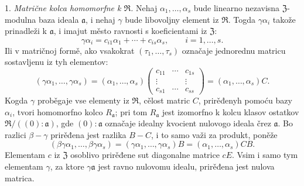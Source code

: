 \documentclass[11pt]{article}
\begin{document}
\setcounter{footnote}{24}

1. \emph{Matrične kolca homomorfne k $\mathfrak R$.} Nehaj $\alpha_1,\ldots,\alpha_s$ bude linearno nezavisna $\mathfrak Z$-modulna baza ideala $\mathfrak a$, i nehaj $\gamma$ bude libovoljny element iz $\mathfrak R$. Togda $\gamma\alpha_i$ takože prinadleži k $\mathfrak a$, i imajut město ravnosti s koeficientami iz $\mathfrak Z$:
\[
        \gamma\alpha_i=c_{i1}\alpha_1+\cdots+c_{is}\alpha_s,
        \qquad i=1,\ldots,s.
\]
Ili v matričnoj formě, ako vsakokrat $(\tau_1,\ldots,\tau_s)$ označaje jednorednu matricu sostavljenu iz tyh elementov:
\[
 (\gamma\alpha_1,\ldots,\gamma\alpha_s)
 = (\alpha_1,\ldots,\alpha_s)
   \begin{pmatrix}
      c_{11}&\cdots&c_{1s}\\
      \vdots&&\vdots\\
      c_{s1}&\cdots&c_{ss}
   \end{pmatrix}
 = (\alpha_1,\ldots,\alpha_s)C.
\]
Kogda $\gamma$ proběgaje vse elementy iz $\mathfrak R$, cělost matric $C$, prirěđenyh pomoću bazy $\alpha_i$, tvori homomorfno kolco $R_\mathfrak a$; pri tom $R_\mathfrak a$ jest izomorfno k kolcu klasov ostatkov $\mathfrak R/((0):\mathfrak a)$, gde $(0):\mathfrak a$ označaje idealny kvocient nulovogo ideala črez $\mathfrak a$. Bo razlici $\beta-\gamma$ prirěđena jest razlika $B-C$, i to samo važi za produkt, poněže
\[
(\beta\gamma\alpha_1,\ldots,\beta\gamma\alpha_s)
=(\gamma\alpha_1,\ldots,\gamma\alpha_s)B
=(\alpha_1,\ldots,\alpha_s)CB.
\]
Elementam $c$ iz $\mathfrak Z$ osoblivo prirěđene sut diagonalne matrice $cE$. Vsim i samo tym elementam $\gamma$, za ktore $\gamma\mathfrak a$ jest ravno nulovomu idealu, prirěđena jest nulova matrica.
\end{document}
